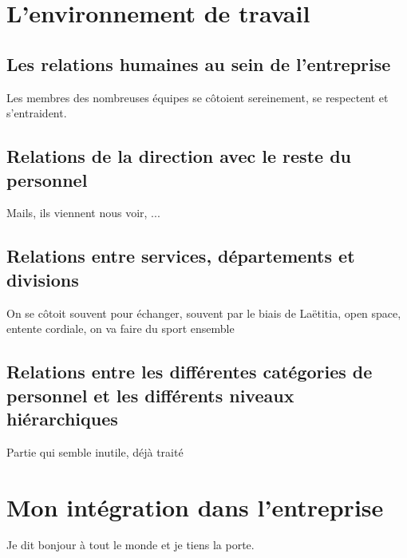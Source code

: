 
\section{L'environnement de travail}
\subsection{Les relations humaines au sein de l'entreprise}
Les membres des nombreuses équipes se côtoient sereinement, se respectent et s'entraident.

\subsection{Relations de la direction avec le reste du personnel}
Mails, ils viennent nous voir, ...

\subsection{Relations entre services, départements et divisions}
On se côtoit souvent pour échanger, souvent par le biais de Laëtitia, open space, entente cordiale, on va faire du sport ensemble

\subsection{Relations entre les différentes catégories de personnel et les différents niveaux hiérarchiques}
Partie qui semble inutile, déjà traité




\section{Mon intégration dans l'entreprise}

Je dit bonjour à tout le monde et je tiens la porte.
